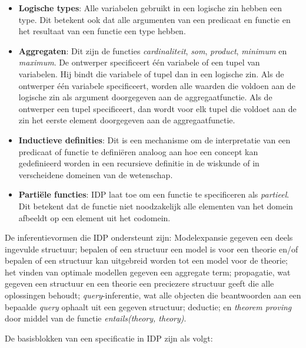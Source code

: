 \begin{itemize}
	\item \textbf{Logische types}: Alle variabelen gebruikt in een logische zin hebben een type. Dit betekent ook dat alle argumenten van een predicaat en functie en het resultaat van een functie een type hebben.
	\item \textbf{Aggregaten}: Dit zijn de functies \textit{cardinaliteit}, \textit{som}, \textit{product}, \textit{minimum} en \textit{maximum}. De ontwerper specificeert \'e\'en variabele of een tupel van variabelen. Hij bindt die variabele of tupel dan in een logische zin. Als de ontwerper \'e\'en variabele specificeert, worden alle waarden die voldoen aan de logische zin als argument doorgegeven aan de aggregaatfunctie. Als de ontwerper een tupel specificeert, dan wordt voor elk tupel die voldoet aan de zin het eerste element doorgegeven aan de aggregaatfunctie.
	\item \textbf{Inductieve definities}: Dit is een mechanisme om de interpretatie van een predicaat of functie te defini\"eren analoog aan hoe een concept kan gedefinieerd worden in een recursieve definitie in de wiskunde of in verscheidene domeinen van de wetenschap.
	\item \textbf{Parti\"ele functies}: IDP laat toe om een functie te specificeren als \textit{partieel}. Dit betekent dat de functie niet noodzakelijk alle elementen van het domein afbeeldt op een element uit het codomein.
\end{itemize}

De inferentievormen die IDP ondersteunt zijn: Modelexpansie gegeven een deels ingevulde structuur; bepalen of een structuur een model is voor een theorie en/of bepalen of een structuur kan uitgebreid worden tot een model voor de theorie; het vinden van optimale modellen gegeven een aggregate term; propagatie, wat gegeven een structuur en een theorie een preciezere structuur geeft die alle oplossingen behoudt; \textit{query}-inferentie, wat alle objecten die beantwoorden aan een bepaalde \textit{query} ophaalt uit een gegeven structuur; deductie; en \textit{theorem proving} door middel van de functie \textit{entails(theory, theory)}.

De basisblokken van een specificatie in IDP zijn als volgt:

